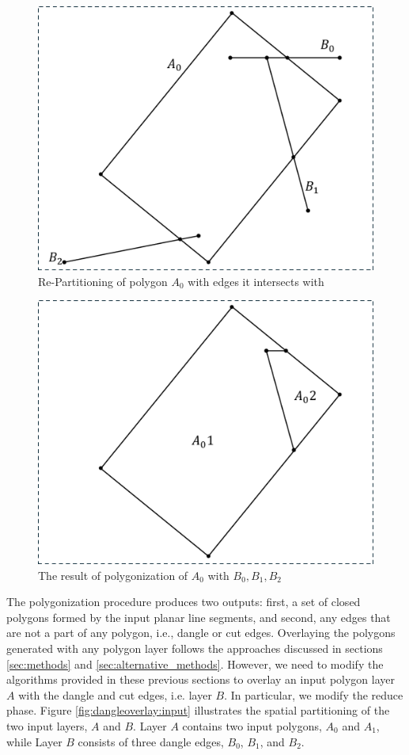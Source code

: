 \begin{figure}[tb]
	\centering
	\includegraphics[width=0.75 \linewidth ]{chapterSDCEL/model/DangleOverlay2.pdf}
	\caption{Re-Partitioning of polygon $A_0$ with edges it intersects with}
	\label{fig:dangleoverlay:inter}
\end{figure}

\begin{figure}[tb]
	\centering
	\includegraphics[width=0.75 \linewidth ]{chapterSDCEL/model/DangleOverlay3.pdf}
	\caption{The result of polygonization of $A_0$ with $B_0, B_1, B_2$}
	\label{fig:dangleoverlay:result}
\end{figure}

The polygonization procedure produces two outputs: first, a set of closed polygons formed by the input planar line segments, and second, any edges that are not 
a part of any polygon, i.e., dangle or cut edges. 
Overlaying the polygons generated with any polygon layer follows the approaches discussed in sections \ref{sec:methods} and \ref{sec:alternative_methods}.
However, we need to modify the algorithms provided in these previous sections to overlay an input polygon layer $A$ with the dangle and cut edges, i.e. layer 
$B$. In particular, we modify the reduce phase.
Figure \ref{fig:dangleoverlay:input} illustrates the spatial partitioning of the two input layers, $A$ and $B$. Layer $A$ contains two input polygons, $A_0$ and 
$A_1$, while Layer $B$ consists of three dangle edges, $B_0$, $B_1$, and $B_2$.

